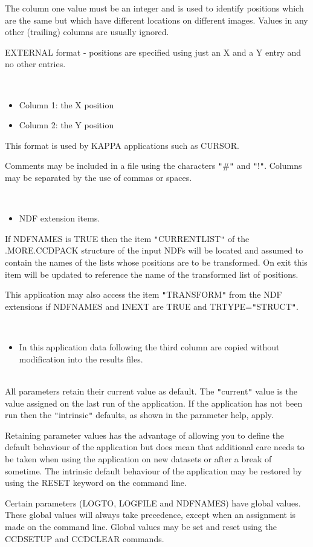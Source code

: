 \documentclass[twoside,11pt]{article}
\newcommand{\htmlref}[2]{#1}
\newcommand{\xref}[3]{#1}
\renewcommand{\_}{\texttt{\symbol{95}}}
\newcommand{\qt}[1]{{\tt "}#1{\tt "}}
\newcommand{\xroutine}[1]{\htmlref{{\sc #1}}{#1}}
\newcommand{\sstdiytopic}[2]{\item[#1:] \mbox{} \\[1.3ex] #2}
\newcommand{\sstitemlist}[1]{
  \mbox{} \\
  \vspace{-3.5ex}
  \begin{itemize}
     #1
  \end{itemize}
}
\newcommand{\sstitem}{\item}
\newcommand{\sstdiytopic}[2]{\item[{#1}] #2 }
\newcommand{\sstitemlist}[1]{
      \begin{itemize}
         #1
      \end{itemize}
      \\
   }
\newcommand{\sstitem}{\item}
\begin{document}
{{{      }
        The column one value must be an integer and is used to identify
        positions which are the same but which have different locations
        on different images. Values in any other (trailing) columns are
        usually ignored.

        EXTERNAL format - positions are specified using just an X and
        a Y entry and no other entries.

      \sstitemlist{

         \sstitem
             Column 1: the X position

         \sstitem
             Column 2: the Y position

      }
        This format is used by KAPPA applications such as
       \xref{CURSOR}{sun95}{CURSOR}.

        Comments may be included in a file using the characters \qt{\#} and
        \qt{!}. Columns may be separated by the use of commas or spaces.

      \sstitemlist{

         \sstitem
         NDF extension items.

      }
        If NDFNAMES is TRUE then the item \qt{CURRENT\_LIST} of the
        .MORE.CCDPACK structure of the input NDFs will be located
        and assumed to contain the names of the lists whose positions
        are to be transformed. On exit this item will be updated to
        reference the name of the transformed list of positions.

        This application may also access the item \qt{TRANSFORM} from
        the NDF extensions if NDFNAMES and INEXT are TRUE and
        TRTYPE=\qt{STRUCT}.

      \sstitemlist{

         \sstitem
         In this application data following the third column are copied
           without modification into the results files.
      }
   }
   \sstdiytopic{
      Behaviour of parameters
   }{
      All parameters retain their current value as default. The
      \qt{current} value is the value assigned on the last run of the
      application. If the application has not been run then the
      \qt{intrinsic} defaults, as shown in the parameter help, apply.

      Retaining parameter values has the advantage of allowing you to
      define the default behaviour of the application but does mean
      that additional care needs to be taken when using the application
      on new datasets or after a break of sometime.  The intrinsic
      default behaviour of the application may be restored by using the
      RESET keyword on the command line.

      Certain parameters (LOGTO, LOGFILE and NDFNAMES) have global
      values. These global values will always take precedence, except
      when an assignment is made on the command line.  Global values may
      be set and reset using the \xroutine{CCDSETUP} and \xroutine{CCDCLEAR} commands.
   }
}
\end{document}
